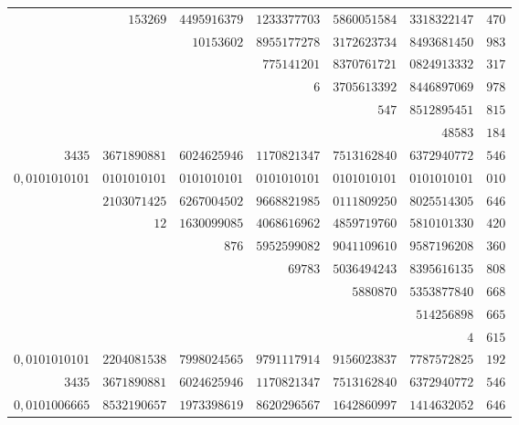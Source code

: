 \begin{longtable}{@{}rrrrrrr@{}}
 & $153269$ & $4495916379$ & $1233377703$ & $5860051584$ & $3318322147$ & $470$\\
 &  & $10153602$ & $8955177278$ & $3172623734$ & $8493681450$ & $983$\\
 &  &  & $775141201$ & $8370761721$ & $0824913332$ & $317$\\
 &  &  & $6$ & $3705613392$ & $8446897069$ & $978$\\
 &  &  &  & $547$ & $8512895451$ & $815$\\
 &  &  &  &  & $48583$ & $184$\\
\hline
$3435$ & $3671890881$ & $6024625946$ & $1170821347$ & $7513162840$ & $6372940772$ & $546$\\
\hline
$0{,}0101010101$ & $0101010101$ & $0101010101$ & $0101010101$ & $0101010101$ & $0101010101$ & $010$\\
 & $2103071425$ & $6267004502$ & $9668821985$ & $0111809250$ & $8025514305$ & $646$\\
 & $12$ & $1630099085$ & $4068616962$ & $4859719760$ & $5810101330$ & $420$\\
 &  & $876$ & $5952599082$ & $9041109610$ & $9587196208$ & $360$\\
 &  &  & $69783$ & $5036494243$ & $8395616135$ & $808$\\
 &  &  &  & $5880870$ & $5353877840$ & $668$\\
 &  &  &  &  & $514256898$ & $665$\\
 &  &  &  &  & $4$ & $615$\\
\hline
$0{,}0101010101$ & $2204081538$ & $7998024565$ & $9791117914$ & $9156023837$ & $7787572825$ & $192$\\
$3435$ & $3671890881$ & $6024625946$ & $1170821347$ & $7513162840$ & $6372940772$ & $546$\\
\hline
$0{,}0101006665$ & $8532190657$ & $1973398619$ & $8620296567$ & $1642860997$ & $1414632052$ & $646$\\
\end{longtable}\endgroup
